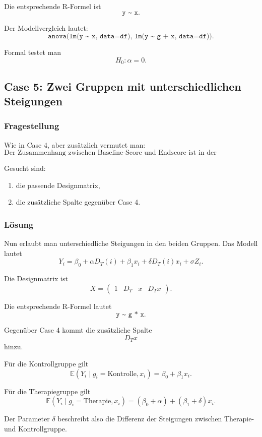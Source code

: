\documentclass[10pt, letterpaper]{article}
\begin{document}
Die entsprechende R-Formel ist
\[
\texttt{y \textasciitilde{} x}.
\]

Der Modellvergleich lautet:
\[
\texttt{anova(lm(y \textasciitilde{} x, data=df), lm(y \textasciitilde{} g + x, data=df))}.
\]

Formal testet man
\[
H_0:\alpha=0.
\]

\subsection{Case 5: Zwei Gruppen mit unterschiedlichen Steigungen}

\subsubsection*{Fragestellung}

Wie in Case 4, aber zusätzlich vermutet man:
\[
\text{Der Zusammenhang zwischen Baseline-Score und Endscore ist in der Therapiegruppe anders als in der Kontrollgruppe.}
\]

Gesucht sind:
\begin{enumerate}
    \item die passende Designmatrix,
    \item die zusätzliche Spalte gegenüber Case 4.
\end{enumerate}

\subsubsection*{Lösung}

Nun erlaubt man unterschiedliche Steigungen in den beiden Gruppen. Das Modell lautet
\[
Y_i
=
\beta_0+\alpha D_T(i)+\beta_1x_i+\delta D_T(i)x_i+\sigma Z_i.
\]

Die Designmatrix ist
\[
X=
\begin{pmatrix}
1 & D_T & x & D_Tx
\end{pmatrix}.
\]

Die entsprechende R-Formel lautet
\[
\texttt{y \textasciitilde{} g * x}.
\]

Gegenüber Case 4 kommt die zusätzliche Spalte
\[
D_Tx
\]
hinzu.

Für die Kontrollgruppe gilt
\[
\mathbb E(Y_i\mid g_i=\text{Kontrolle},x_i)
=
\beta_0+\beta_1x_i.
\]

Für die Therapiegruppe gilt
\[
\mathbb E(Y_i\mid g_i=\text{Therapie},x_i)
=
(\beta_0+\alpha)+(\beta_1+\delta)x_i.
\]

Der Parameter \(\delta\) beschreibt also die Differenz der Steigungen zwischen Therapie- und Kontrollgruppe.
\end{document}
